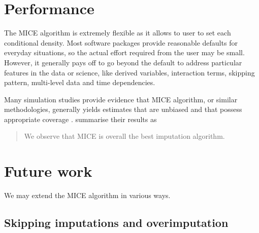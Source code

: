 \documentclass[
]{book}
\begin{document}
\hypertarget{performance}{%
\section{Performance}\label{performance}}

The MICE algorithm is extremely flexible as it allows to user to set each conditional density. Most software packages provide reasonable defaults for everyday situations, so the actual effort required from the user may be small. However, it generally pays off to go beyond the default to address particular features in the data or science, like derived variables, interaction terms, skipping pattern, multi-level data and time dependencies.

Many simulation studies provide evidence that MICE algorithm, or similar methodologies, generally yields estimates that are unbiased and that possess appropriate coverage \citep{BRAND1999, RAGHUNATHAN2001, BRAND2003, TANG2005, VANBUUREN2006, HORTON2007, YU2007}. \citet{NAIR2013} summarise their results as

\begin{quote}
We observe that MICE is overall the best imputation algorithm.
\end{quote}

\hypertarget{future-work}{%
\section{Future work}\label{future-work}}

We may extend the MICE algorithm in various ways.

\hypertarget{skipping-imputations-and-overimputation}{%
\subsection{Skipping imputations and overimputation}\label{skipping-imputations-and-overimputation}}
\end{document}
